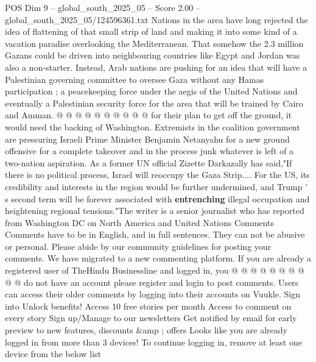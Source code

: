 \begin{textsample}{POS Dim 9 – global\_south\_2025\_05 – Score 2.00 – global\_south\_2025\_05/124596361.txt}
Nations in the area have long rejected the idea of flattening of that small strip of land and making it into some kind of a vacation paradise overlooking the Mediterranean.
That somehow the 2.3 million Gazans could be driven into neighbouring countries like Egypt and Jordan was also a non-starter.
Instead, Arab nations are pushing for an idea that will have a Palestinian governing committee to oversee Gaza without any Hamas participation ; a peacekeeping force under the aegis of the United Nations and eventually a Palestinian security force for the area that will be trained by Cairo and Amman. @ @ @ @ @ @ @ @ @ @ for their plan to get off the ground, it would need the backing of Washington.
Extremists in the coalition government are pressuring Israeli Prime Minister Benjamin Netanyahu for a new ground offensive for a complete takeover and in the process junk whatever is left of a two-nation aspiration.
As a former UN official Zizette Darkazally has said,"If there is no political process, Israel will reoccupy the Gaza Strip....
For the US, its credibility and interests in the region would be further undermined, and Trump ' s second term will be forever associated with \textbf{entrenching} illegal occupation and heightening regional tensions."The writer is a senior journalist who has reported from Washington DC on North America and United Nations Comments Comments have to be in English, and in full sentences.
They can not be abusive or personal.
Please abide by our community guidelines for posting your comments.
We have migrated to a new commenting platform.
If you are already a registered user of TheHindu Businessline and logged in, you @ @ @ @ @ @ @ @ @ @ do not have an account please register and login to post comments.
Users can access their older comments by logging into their accounts on Vuukle.
Sign into Unlock benefits!
Access 10 free stories per month Access to comment on every story Sign up/Manage to our newsletters Get notified by email for early preview to new features, discounts \&amp ; offers Looks like you are already logged in from more than 3 devices!
To continue logging in, remove at least one device from the below list

\end{textsample}
